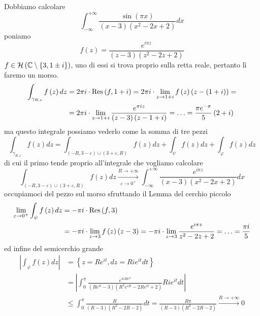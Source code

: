 Dobbiamo calcolare
\begin{equation*}
\int^{+ \infty}_{- \infty}\frac{\sin\left(\pi x\right)}{\left(x - 3\right)\left(x^{2} - 2x + 2\right)} dx
\end{equation*}
poniamo
\begin{equation*}
f\left(z\right) = \frac{e^{i\pi z}}{\left(z - 3\right)\left(z^{2} - 2z + 2\right)}
\end{equation*}
$f\in \mathcal{H} \left(\mathbb{C}  \setminus \left\{3, 1\pm i\right\}\right)$, uno di essi si trova proprio sulla retta reale, pertanto lì faremo un morso.
\begin{align*}
\int_{\gamma_{R, \varepsilon}} f\left(z\right) dz & = 2\pi i \cdot \operatorname{Res} \left(f, 1 + i\right) = 2\pi i \cdot \lim_{z\rightarrow 1 + i} f\left(z\right)\left(z - \left(1 + i\right)\right) = \\
 & = 2\pi i \cdot \lim_{z\rightarrow 1 + i}\frac{e^{\pi iz}}{\left(z - 3\right)\left(z - 1 + i\right)} = \dotsc = \frac{\pi e^{- \pi}}{5}\left(2 + i\right)
\end{align*}
ma questo integrale possiamo vederlo come la somma di tre pezzi
\begin{equation*}
\int_{\gamma_{R, \varepsilon}} f\left(z\right) dz = \int_{\left(- R, 3 - \varepsilon \right) \cup \left(3 + \varepsilon, R\right)} f\left(z\right) dz + \int_{\psi} f\left(z\right) dz + \int_{\varphi} f\left(z\right) dz
\end{equation*}
di cui il primo tende proprio all'integrale che vogliamo calcolare
\begin{equation*}
\int_{\left(- R, 3 - \varepsilon \right) \cup \left(3 + \varepsilon, R\right)} f\left(z\right) dz\xrightarrow[\varepsilon \rightarrow 0^{+}]{R\rightarrow + \infty}\int^{+ \infty}_{- \infty}\frac{e^{i\pi z}}{\left(x - 3\right)\left(x^{2} - 2x + 2\right)} dx
\end{equation*}
occupiamoci del pezzo sul morso sfruttando il Lemma del cerchio piccolo
\begin{align*}
\lim_{\varepsilon \rightarrow 0^{+}}\int_{\psi} f\left(z\right) dz & = - \pi i \cdot \operatorname{Res} \left(f, 3\right)\\
 & = - \pi i \cdot \lim_{z\rightarrow 3} f\left(z\right)\left(z - 3\right) = - \pi i \cdot \lim_{z\rightarrow 3}\frac{e^{i\pi z}}{z^{2} - 2z + 2} = \dotsc = \frac{\pi i}{5}
\end{align*}
ed infine del semicerchio grande
\begin{align*}
\left| \int_{\varphi} f\left(z\right) dz\right|  & = \left\{z = Re^{it}, dz = Rie^{it} dt\right\}\\
 & = \left| \int^{\pi}_{0}\frac{e^{\pi iRe^{it}}}{\left(Re^{it} - 3\right)\left(R^{2} e^{i2t} - 2Re^{it} + 2\right)} Rie^{it} dt\right| \\
 & \leq \int^{\pi}_{0}\frac{R}{\left(R - 3\right)\left(R^{2} - 2R - 2\right)} dt = \frac{R\pi}{\left(R - 3\right)\left(R^{2} - 2R - 2\right)}\xrightarrow{R\rightarrow + \infty} 0
\end{align*}
